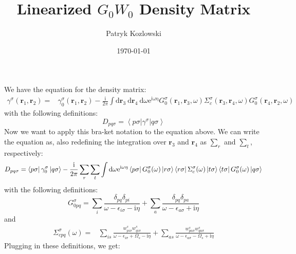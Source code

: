 \documentclass[12pt]{article}
\title{Linearized $G_0W_0$ Density Matrix}
\author{Patryk Kozlowski}
\date{\today}
\begin{document}
\maketitle
We have the equation for the density matrix:
\begin{equation}
\begin{aligned}
\gamma^\sigma\left(\mathbf{r}_1, \mathbf{r}_2\right)= & \gamma_0^\sigma\left(\mathbf{r}_1, \mathbf{r}_2\right) -\frac{\mathrm{i}}{2 \pi} \int \mathrm{d} \mathbf{r}_3 \mathrm{~d} \mathbf{r}_4 \mathrm{~d} \omega \mathrm{e}^{\mathrm{i \omega \eta}} G_0^\sigma\left(\mathbf{r}_1, \mathbf{r}_3, \omega\right) \Sigma_c^\sigma\left(\mathbf{r}_3, \mathbf{r}_4, \omega\right) G_0^\sigma\left(\mathbf{r}_4, \mathbf{r}_2, \omega\right)
\end{aligned}
\end{equation}
with the following definitions:
\begin{equation}
D_{p q \sigma}=\left\langle p \sigma\left|\gamma^\sigma\right| q \sigma\right\rangle
\end{equation}
Now we want to apply this bra-ket notation to the equation above. We can write the equation as, also redefining the integration over $\mathbf{r}_3$ and $\mathbf{r}_4$ as $\sum_{r}$ and $\sum_{t}$, respectively: 
\begin{equation}
    D_{p q \sigma}=\bra{p\sigma } \gamma _0^\sigma \ket{q\sigma } -\frac{\mathrm{i }}{2 \pi} \sum_{r} \sum_{t} \int \mathrm{d} \omega \mathrm{e}^{\mathrm{i \omega \eta}} \bra{p\sigma } G_0^\sigma (\omega) \ket{r\sigma } \bra{r\sigma } \Sigma_c^\sigma (\omega) \ket{t\sigma } \bra{t\sigma } G_0^\sigma (\omega) \ket{q\sigma }
\end{equation}
with the following definitions:
\begin{equation}
G_{0 p q}^\sigma=\sum_i \frac{\delta_{p q} \delta_{p i}}{\omega-\epsilon_{i \sigma}-\mathrm{i} \eta}+\sum_a \frac{\delta_{p q} \delta_{p a}}{\omega-\epsilon_{a \sigma}+\mathrm{i} \eta}
\end{equation}
and
\begin{equation}
\begin{aligned}
\Sigma_{c p q}^\sigma(\omega)= & \sum_{i s} \frac{w_{p i \sigma}^s w_{q i \sigma}^s}{\omega-\epsilon_{i \sigma}+\Omega_s-\mathrm{i} \eta} +\sum_{a s} \frac{w_{p a \sigma}^s w_{q a \sigma}^s}{\omega-\epsilon_{a \sigma}-\Omega_s+\mathrm{i} \eta}
\end{aligned}
\end{equation}
Plugging in these definitions, we get:
\end{document}
